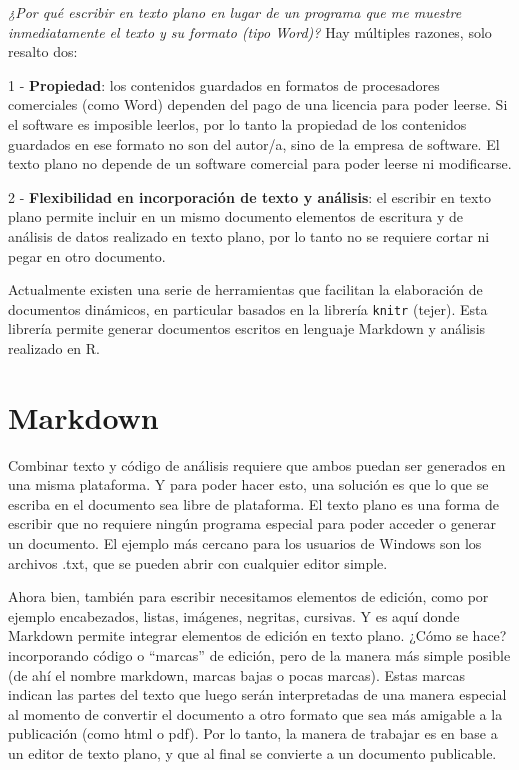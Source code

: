 \documentclass[
  11pt,
]{book}
\begin{document}
\emph{¿Por qué escribir en texto plano en lugar de un programa que me muestre inmediatamente el texto y su formato (tipo Word)?}
Hay múltiples razones, solo resalto dos:

1 - \textbf{Propiedad}: los contenidos guardados en formatos de procesadores comerciales (como Word) dependen del pago de una licencia para poder leerse. Si el software es imposible leerlos, por lo tanto la propiedad de los contenidos guardados en ese formato no son del autor/a, sino de la empresa de software. El texto plano no depende de un software comercial para poder leerse ni modificarse.

2 - \textbf{Flexibilidad en incorporación de texto y análisis}: el escribir en texto plano permite incluir en un mismo documento elementos de escritura y de análisis de datos realizado en texto plano, por lo tanto no se requiere cortar ni pegar en otro documento.

Actualmente existen una serie de herramientas que facilitan la elaboración de documentos dinámicos, en particular basados en la librería \texttt{knitr} (tejer). Esta librería permite generar documentos escritos en lenguaje Markdown y análisis realizado en R.

\hypertarget{markdown}{%
\section{Markdown}\label{markdown}}

Combinar texto y código de análisis requiere que ambos puedan ser generados en una misma plataforma. Y para poder hacer esto, una solución es que lo que se escriba en el documento sea libre de plataforma. El texto plano es una forma de escribir que no requiere ningún programa especial para poder acceder o generar un documento. El ejemplo más cercano para los usuarios de Windows son los archivos .txt, que se pueden abrir con cualquier editor simple.

Ahora bien, también para escribir necesitamos elementos de edición, como por ejemplo encabezados, listas, imágenes, negritas, cursivas. Y es aquí donde Markdown permite integrar elementos de edición en texto plano. ¿Cómo se hace? incorporando código o ``marcas'' de edición, pero de la manera más simple posible (de ahí el nombre markdown, marcas bajas o pocas marcas). Estas marcas indican las partes del texto que luego serán interpretadas de una manera especial al momento de convertir el documento a otro formato que sea más amigable a la publicación (como html o pdf). Por lo tanto, la manera de trabajar es en base a un editor de texto plano, y que al final se convierte a un documento publicable.
\end{document}

